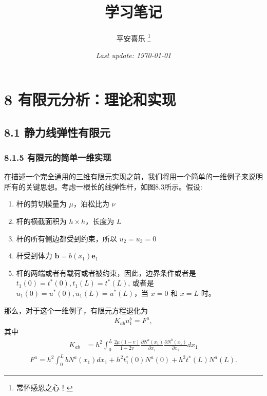 \documentclass[12pt,a4paper]{book}
\title{\LARGE\bfseries\songti 学习笔记}
\author{ \kaishu 平安喜乐
		\thanks{常怀感恩之心！} \\[0.5ex] %
		}
\date{\small\itshape Last update: \today}
\begin{document}
\songti

\maketitle 
\clearpage

\tableofcontents  
\clearpage




\clearpage
\chapter*{8 有限元分析：理论和实现}

\section*{8.1 静力线弹性有限元}


\subsection*{8.1.5 有限元的简单一维实现}


在描述一个完全通用的三维有限元实现之前，我们将用一个简单的一维例子来说明所有的关键思想。考虑一根长的线弹性杆，如图8.3所示。假设:

\begin{enumerate}
    \item 杆的剪切模量为 $\mu$，泊松比为 $\nu$
    \item 杆的横截面积为 $h\times h$，长度为 $L$
    \item 杆的所有侧边都受到约束，所以 $u_2=u_3=0$
    \item 杆受到体力 $\bm{b} = b(x_1) \bm{e}_1$
    \item 杆的两端或者有载荷或者被约束，因此，边界条件或者是 $t_1(0) = t^*(0), t_1(L) = t^*(L)$, 或者是 $u_1(0) = u^*(0), u_1(L) = u^*(L)$，当 $x=0$ 和 $x=L$ 时。
\end{enumerate}

那么，对于这个一维例子，有限元方程退化为
\begin{equation*}
    \begin{aligned}
        K_{ab} u_1^b = F^a,
    \end{aligned}
\end{equation*}
其中
\begin{equation*}
    \begin{aligned}
        K_{a b} & = h^{2} \int_{0}^{L} \frac{2 \mu(1-v)}{1-2 v} \frac{\partial N^{a}\left(x_{1}\right)}{\partial x_{1}} \frac{\partial N^{b}\left(x_{1}\right)}{\partial x_{1}} d x_{1}
    \end{aligned}
\end{equation*}
%
\begin{equation*}
    \begin{aligned}
        F^{a}=h^{2} \int_{0}^{L} b N^{a}\left(x_{1}\right) d x_{1}+h^{2} t_{1}^{*}(0) N^{a}(0)+h^{2} t^{*}(L) N^{a}(L) .
    \end{aligned}
\end{equation*}
\end{document}
